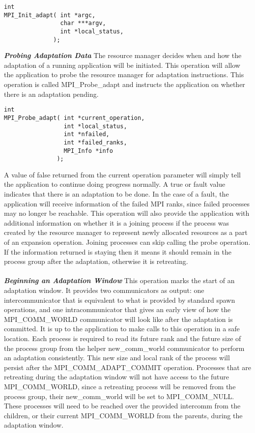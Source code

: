 \begin{lstlisting}[frame=single]
int 
MPI_Init_adapt( int *argc,
                char ***argv,
                int *local_status,
              );
\end{lstlisting}
\textbf{\textit{Probing Adaptation Data}} The resource manager decides when and how the adaptation of a running application will be initiated. This operation will allow the application to probe the resource manager for adaptation instructions. This operation is called MPI{\_}Probe{\_}adapt and instructs the application on whether there is an adaptation pending.  
\begin{lstlisting}[frame=single]
int
MPI_Probe_adapt( int *current_operation,
                 int *local_status,
                 int *nfailed,
                 int *failed_ranks,
                 MPI_Info *info
               );
\end{lstlisting}
A value of false returned from the current operation parameter will simply tell the application to continue doing progress normally. A true or fault value indicates that there is an adaptation to be done. In the case of a fault, the application will receive information of the failed MPI ranks, since failed processes may no longer be reachable. This operation will also provide the application with additional information on whether it is a joining process if the process was created by the resource manager to represent newly allocated resources as a part of an expansion operation. Joining processes can skip calling the probe operation. If the information returned is staying then it means it should remain in the process group after the adaptation, otherwise it is retreating.\\ \\
\textbf{\textit{Beginning an Adaptation Window}} This operation marks the start of an adaptation window. It provides two communicators as output: one intercommunicator that is equivalent to what is provided by standard spawn operations, and one intracommunicator that gives an early view of how the MPI{\_}COMM{\_}WORLD communicator will look like after the adaptation is committed. It is up to the application to make calls to this operation in a safe location. Each process is required to read its future rank and the future  size of the process group from the helper new{\_}comm{\_}world communicator to perform an adaptation consistently. This new size and local rank of the process will persist after the MPI{\_}COMM{\_}ADAPT{\_}COMMIT operation. Processes that are retreating during the adaptation window will not have access to the future MPI{\_}COMM{\_}WORLD, since a retreating process will be removed from the process group, their new{\_}comm{\_}world will be set to MPI{\_}COMM{\_}NULL. These processes will need to be reached over the provided intercomm from the children, or their current MPI{\_}COMM{\_}WORLD from the parents, during the adaptation window.
